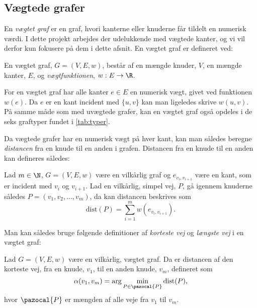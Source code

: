\subsection{Vægtede grafer} \label{kap:vaegtede}
En \emph{vægtet graf} er en graf, hvori kanterne eller knuderne får tildelt en numerisk værdi. I dette projekt arbejdes der udelukkende med vægtede kanter, og vi vil derfor kun fokusere på dem i dette afsnit.
En vægtet graf er defineret ved:
\begin{defn}
En vægtet graf, $G=(V,E,w)$, består af en mængde knuder, $V$, en mængde kanter, $E$, og \emph{vægtfunktionen}, $w: E \rightarrow \R$.
\end{defn}

For en vægtet graf har alle kanter $e\in E$ en numerisk vægt, givet ved funktionen $w (e)$. Da $e$ er en kant incident med $\{u,v\}$ kan man ligeledes skrive $w (u,v)$. På samme måde som med uvægtede grafer, kan en vægtet graf også opdeles i de seks graftyper fundet i \autoref{tab:typer}.


Da vægtede grafer har en numerisk vægt på hver kant, kan man således beregne \emph{distancen} fra en knude til en anden i grafen. Distancen fra en knude til en anden kan defineres således:

\begin{defn}[Distance]
Lad $m\in \N $, $G=(V,E,w)$ være en vilkårlig graf og  $e_{v_i,v_{i+1}}$ være en kant, som er incident med $v_i$ og $v_{i+1}$. Lad en vilkårlig, simpel vej, $P$, gå igennem knuderne således $P=(v_{1},v_{2},\dotsc,v_{m})$, da kan distancen beskrives som
	\begin{equation}
	\mathrm{dist}(P)=\sum_{i=1}^{m}w(e_{v_i,v_{i+1}}).
	\end{equation}  
\end{defn}

Man kan således bruge følgende definitioner af \emph{korteste vej} og \emph{længste vej} i en vægtet graf:


\begin{defn} \label{defn:min.vej}
Lad $G=(V,E,w)$ være en vilkårlig, vægtet graf. Da er distancen af den korteste vej, fra en knude, $v_1$, til en anden knude, $v_m$, defineret som
	\begin{equation}
		\alpha(v_1,v_m)=\arg \min_{P \in \pazocal{P}}
		\textrm{dist}(P),
	\end{equation}
	hvor $\pazocal{P}$ er mængden af alle veje fra $v_1$ til $v_m$.
\end{defn}

